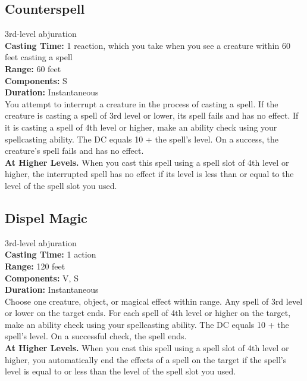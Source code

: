 \documentclass[11pt, A4paper, english]{article}
\begin{document}
		\subsection{Counterspell}
3rd-level abjuration \\
\textbf{Casting Time:} 1 reaction, which you take when you see a creature within 60 feet casting a spell \\
\textbf{Range:} 60 feet \\
\textbf{Components:} S \\
\textbf{Duration:} Instantaneous \\
You attempt to interrupt a creature in the process of casting a spell. If the creature is casting a spell of 3rd level or lower, its spell fails and has no effect. If it is casting a spell of 4th level or higher, make an ability check using your spellcasting ability. The DC equals 10 + the spell's level. On a success, the creature's spell fails and has no effect. \\
\textbf{At Higher Levels.} When you cast this spell using a spell slot of 4th level or higher, the interrupted spell has no effect if its level is less than or equal to the level of the spell slot you used.

		\subsection{Dispel Magic}
3rd-level abjuration \\
\textbf{Casting Time:} 1 action \\
\textbf{Range:} 120 feet \\
\textbf{Components:} V, S \\
\textbf{Duration:} Instantaneous \\
Choose one creature, object, or magical effect within range. Any spell of 3rd level or lower on the target ends. For each spell of 4th level or higher on the target, make an ability check using your spellcasting ability. The DC equals 10 + the spell's level. On a successful check, the spell ends. \\
\textbf{At Higher Levels.} When you cast this spell using a spell slot of 4th level or higher, you automatically end the effects of a spell on the target if the spell’s level is equal to or less than the level of the spell slot you used.
\end{document}
